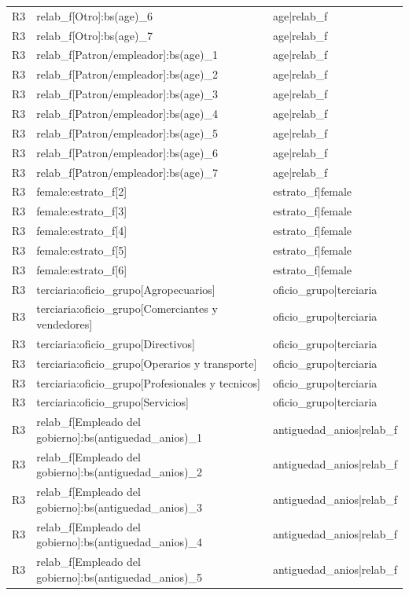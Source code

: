 \begin{longtable}{lll}
R3 & relab\_f[Otro]:bs(age)\_6 & age|relab\_f \\
R3 & relab\_f[Otro]:bs(age)\_7 & age|relab\_f \\
R3 & relab\_f[Patron/empleador]:bs(age)\_1 & age|relab\_f \\
R3 & relab\_f[Patron/empleador]:bs(age)\_2 & age|relab\_f \\
R3 & relab\_f[Patron/empleador]:bs(age)\_3 & age|relab\_f \\
R3 & relab\_f[Patron/empleador]:bs(age)\_4 & age|relab\_f \\
R3 & relab\_f[Patron/empleador]:bs(age)\_5 & age|relab\_f \\
R3 & relab\_f[Patron/empleador]:bs(age)\_6 & age|relab\_f \\
R3 & relab\_f[Patron/empleador]:bs(age)\_7 & age|relab\_f \\
R3 & female:estrato\_f[2] & estrato\_f|female \\
R3 & female:estrato\_f[3] & estrato\_f|female \\
R3 & female:estrato\_f[4] & estrato\_f|female \\
R3 & female:estrato\_f[5] & estrato\_f|female \\
R3 & female:estrato\_f[6] & estrato\_f|female \\
R3 & terciaria:oficio\_grupo[Agropecuarios] & oficio\_grupo|terciaria \\
R3 & terciaria:oficio\_grupo[Comerciantes y vendedores] & oficio\_grupo|terciaria \\
R3 & terciaria:oficio\_grupo[Directivos] & oficio\_grupo|terciaria \\
R3 & terciaria:oficio\_grupo[Operarios y transporte] & oficio\_grupo|terciaria \\
R3 & terciaria:oficio\_grupo[Profesionales y tecnicos] & oficio\_grupo|terciaria \\
R3 & terciaria:oficio\_grupo[Servicios] & oficio\_grupo|terciaria \\
R3 & relab\_f[Empleado del gobierno]:bs(antiguedad\_anios)\_1 & antiguedad\_anios|relab\_f \\
R3 & relab\_f[Empleado del gobierno]:bs(antiguedad\_anios)\_2 & antiguedad\_anios|relab\_f \\
R3 & relab\_f[Empleado del gobierno]:bs(antiguedad\_anios)\_3 & antiguedad\_anios|relab\_f \\
R3 & relab\_f[Empleado del gobierno]:bs(antiguedad\_anios)\_4 & antiguedad\_anios|relab\_f \\
R3 & relab\_f[Empleado del gobierno]:bs(antiguedad\_anios)\_5 & antiguedad\_anios|relab\_f \\

\end{longtable}

